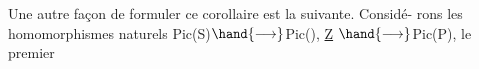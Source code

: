 Une autre façon de formuler ce corollaire est la suivante. Considé-%
rons les homomorphismes naturels Pic(S)$\hand{\longrightarrow}$Pic(), \underline{Z} $\hand{\longrightarrow}$Pic(P), le premier
